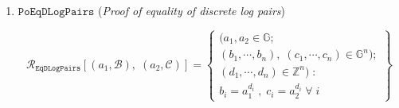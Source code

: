 \documentclass[11pt, lettersize, notitlepage, leqno, footskip=0.6cm]{article}
\newcommand{\bz}{\mathbb Z}
\newcommand{\ttt}{\texttt}
\newcommand{\mc}{\mathcal}
\newcommand{\mb}{\mathbb}
\newcommand{\mr}{\mathrm}
\newcommand{\lamb}{\lambda}
\newcommand{\noin}{\noindent}
\newtheorem{Prot}[Thm]{Protocol}
\numberwithin{equation}{section}
\begin{document}
{\begin{enumerate}[wide, labelwidth=!, labelindent=0pt]
\[
  \mc{R}_{\ttt{AggEqDLog}}[(a, b),\;(\mc{A},\;\mc{B})] = \left\{\begin{array}{l}
  	((a, b)\in\mb{G}^2\\
    \mc{A} = (a_1, \cdots, a_n),\;\mc{B} = (b_1,\cdots, b_n)\in\mb{G}^n);\\
    d\in\mb{Z}): \\
    b_i = a_1^{d} \;\forall\;i
  \end{array}\right\}
\]


\item $\ttt{PoEqDLogPairs}$ (\textit{Proof of equality of discrete log pairs}) \vspace{-0.3cm}

\[
  \mc{R}_{{\ttt{EqDLogPairs}}}[(a_1, \mc{B}),\; (a_2, \mc{C})] = \left\{\begin{array}{l}
  	(a_1,a_2\in\mb{G};\\
    (b_1,\cdots, b_n),\;(c_1,\cdots, c_n)\in\mb{G}^n);\\
    (d_1,\cdots,d_n)\in \bz^n)\;: \\
    b_i = a_1^{d_i}\;,\;c_i= a_2^{d_i} \;\forall\; i
  \end{array}\right\}
\]

\end{enumerate}







\vspace{0.2cm}






\bigskip

\newpage




\begin{comment}


\vspace{0.1cm}

\begin{Prot} Protocol for intersection of multisets.\end{Prot} \vspace{-0.3cm}

\noin \textbf{Parameters:} $\mb{G}\xleftarrow{\$} \mr{GGen}(\lamb)$,\; $g\in \mb{G}$.

\noin \textbf{Inputs:} Commitments $A_i := g^{\Pi(\mc{M}_i)}$ for multisets $\mc{M}_i$; an element $A_{\tt{\cap}}\in\mb{G}$

\noin \textbf{Claim:} $A_{\tt{\cap}} = \protect{\verb|Com|}(g, {\bigcap\limits_{i=1}^n} \mc{M}_i) := g^{\Pi({\bigcap\limits_{i=1}^n} \mc{M}_i)}$.


\end{comment}}
\end{document}
